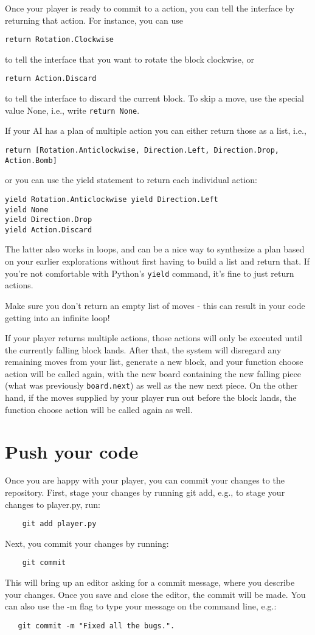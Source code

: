 \documentclass{article}
\begin{document}
Once your player is ready to commit to a action, you can tell the
interface by returning that action. For instance, you can use
\begin{verbatim}
return Rotation.Clockwise
\end{verbatim}
to tell the interface that you want to rotate the
block clockwise, or
\begin{verbatim}
return Action.Discard
\end{verbatim}
 to tell the interface to
discard the current block. To skip a move, use the special value None,
i.e., write \texttt{return None}.

If your AI has a plan of multiple action you can either return those as a list, i.e.,
\begin{verbatim}
return [Rotation.Anticlockwise, Direction.Left, Direction.Drop, Action.Bomb]
\end{verbatim}
or you can use the yield statement to return each individual action:
\begin{verbatim}
yield Rotation.Anticlockwise yield Direction.Left
yield None
yield Direction.Drop
yield Action.Discard
\end{verbatim}
The latter also works in loops, and can be a nice way to synthesize a
plan based on your earlier explorations without first having to build
a list and return that. If you’re not comfortable with Python’s \texttt{yield}
command, it’s fine to just return actions.

Make sure you don't return an empty list of moves - this can result in
your code getting into an infinite loop!

If your player returns multiple actions, those actions will only be
executed until the currently falling block lands. After that, the
system will disregard any remaining moves from your list, generate a
new block, and your function choose action will be called again, with
the new board containing the new falling piece (what was previously
\texttt{board.next}) as well as the new next piece. On the other hand,
if the moves supplied by your player run out before the block lands,
the function choose action will be called again as well.

\section{Push your code}
Once you are happy with your player, you can commit your changes to
the repository. First, stage your changes by running git add, e.g., to
stage your changes to player.py, run:
\begin{verbatim}
    git add player.py
\end{verbatim}
Next, you commit your changes by running:
\begin{verbatim}
    git commit
\end{verbatim}
This will bring up an editor asking for a commit message, where you
describe your changes. Once you save and close the editor, the commit
will be made. You can also use the -m flag to type your message on the
command line, e.g.:
\begin{verbatim}
   git commit -m "Fixed all the bugs.".
\end{verbatim}
\end{document}
